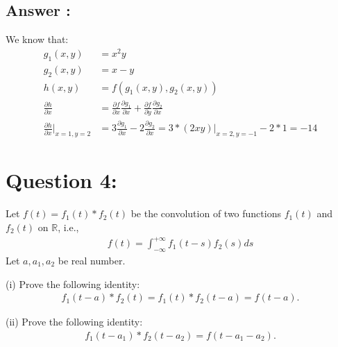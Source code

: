 \documentclass[a4paper,12pt]{article}
\newcommand{\R}{\mathbb{R}}
\begin{document}
\subsection*{Answer :}
We know that:
\begin{align*}
    g_1(x, y) &= x^2y \\
    g_2(x, y) &= x - y \\
    h(x, y) &= f(g_1(x, y), g_2(x, y)) \\
    \frac{\partial h}{\partial x} &= \frac{\partial f}{\partial x} \frac{\partial g_1}{\partial x} + \frac{\partial f}{\partial y} \frac{\partial g_2}{\partial x} \\
    \frac{\partial h}{\partial x}|_{x=1, y=2} &= 3\frac{\partial g_1}{\partial x} -2\frac{\partial g_2}{\partial x} = 3 * (2xy)|_{x=2, y=-1} - 2 * 1 = -14
\end{align*}


\section*{Question 4:}
Let \(f(t) = f_1(t) * f_2(t)\) be the convolution of two functions \(f_1(t)\) and \(f_2(t)\) on \(\R\), i.e.,
\begin{align*}
    f(t) = \int_{-\infty}^{+\infty} f_1(t - s)f_2(s)ds
\end{align*}
Let \(a, a_1, a_2\) be real number.

\vspace{1cm}
\noindent
(i) Prove the following identity:
\begin{align*}
    f_1(t-a)*f_2(t) = f_1(t) * f_2(t-a) = f(t-a).
\end{align*}

\noindent
(ii) Prove the following identity:
\begin{align*}
    f_1(t-a_1) * f_2(t-a_2) = f(t-a_1-a_2).
\end{align*}
\end{document}
